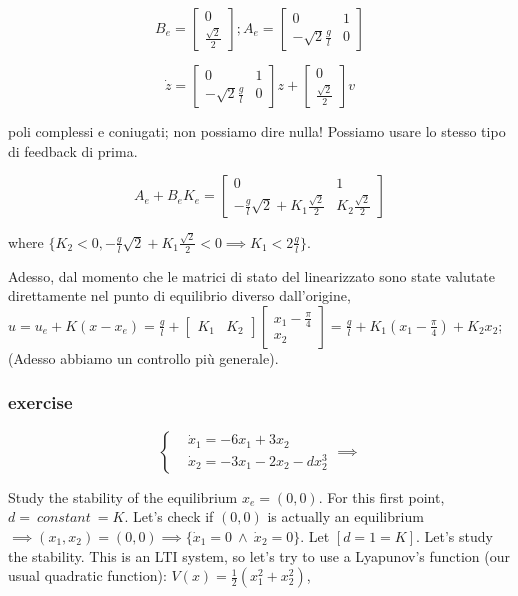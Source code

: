 \[
	B_e = \begin{bmatrix}0\\ \frac{\sqrt{2}}{2}\end{bmatrix}; A_e = \begin{bmatrix}
	0 & 1 \\ -\sqrt{2}\frac{g}{l} & 0\end{bmatrix}
\]

\[
	\dot{z} = \begin{bmatrix}
	0 & 1 \\ -\sqrt{2}\frac{g}{l} & 0\end{bmatrix}z + \begin{bmatrix}0\\ \frac{\sqrt{2}}{2}\end{bmatrix}v
\]

poli complessi e coniugati; non possiamo dire nulla! Possiamo usare lo stesso tipo di feedback di prima.

\[
	A_e + B_eK_e = \begin{bmatrix}0&1\\-\frac{g}{l}\sqrt{2} + K_1\frac{\sqrt{2}}{2} & K_2\frac{\sqrt{2}}{2}\end{bmatrix}
\]

where $\{K_2 < 0, -\frac{g}{l}\sqrt{2} + K_1\frac{\sqrt{2}}{2} < 0 \implies K_1 < 2\frac{g}{l}\}$.

Adesso, dal momento che le matrici di stato del linearizzato sono state valutate direttamente nel punto di equilibrio diverso dall'origine, $u = u_e + K(x-x_e) = \frac{g}{l} + \begin{bmatrix}K_1&K_2\end{bmatrix}\begin{bmatrix}x_1-\frac{\pi}{4}\\x_2\end{bmatrix} = \frac{g}{l} + K_1(x_1-\frac{\pi}{4}) + K_2x_2$;
(Adesso abbiamo un controllo più generale).

\subsubsection{exercise}

\[	
	\left\{
	\begin{aligned}
	&\dot{x}_1 = -6x_1 + 3x_2 \\
	&\dot{x}_2 = -3x_1 -2x_2 -dx_2^3
	\end{aligned} 
	\right. \implies 
\]

Study the stability of the equilibrium $x_e=(0,0)$. For this first point, $d =\ constant\ = K$. Let's check if $(0,0)$ is actually an equilibrium $\implies (x_1,x_2)=(0,0) \implies \{\dot{x}_1 = 0\ \land\ \dot{x}_2 = 0\}$. Let $[d=1=K]$. Let's study the stability. This is an LTI system, so let's try to use a Lyapunov's function (our usual quadratic function): $V(x) = \frac{1}{2}(x_1^2 + x_2^2)$,

